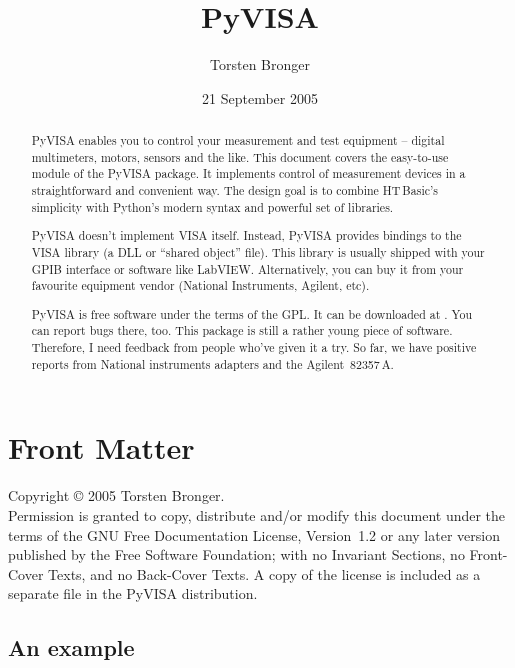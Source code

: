\documentclass{howto}
\title{PyVISA}
\author{Torsten Bronger}
\date{21 September 2005}
\begin{document}
\maketitle

\ifhtml
\chapter*{Front Matter\label{front}}
\fi

Copyright \copyright{} 2005 Torsten Bronger.\\
Permission is granted to copy, distribute and/or modify this document under the
terms of the GNU Free Documentation License, Version~1.2 or any later version
published by the Free Software Foundation; with no Invariant Sections, no
Front-Cover Texts, and no Back-Cover Texts.  A copy of the license is included
as a separate file  in the PyVISA distribution.

\begin{abstract}

\noindent
PyVISA enables you to control your measurement and test equipment -- digital
multimeters, motors, sensors and the like.  This document covers the
easy-to-use  module of the PyVISA package.  It implements control
of measurement devices in a straightforward and convenient way.  The design
goal is to combine HT\,Basic's simplicity with Python's modern syntax and
powerful set of libraries.

PyVISA doesn't implement VISA itself.  Instead, PyVISA provides bindings to the
VISA library (a DLL or ``shared object'' file).  This library is usually
shipped with your GPIB interface or software like LabVIEW\@.  Alternatively,
you can buy it from your favourite equipment vendor (National Instruments,
Agilent, etc).

PyVISA is free software under the terms of the GPL\@.  It can be downloaded at
.  You can
report bugs there, too.  This package is still a rather young piece of
software.  Therefore, I need feedback from people who've given it a try.  So
far, we have positive reports from National instruments adapters and the
Agilent~82357\,A\@.
\end{abstract}

\begin{samepage}
  \tableofcontents
\end{samepage}


\section{An example}
\end{document}

